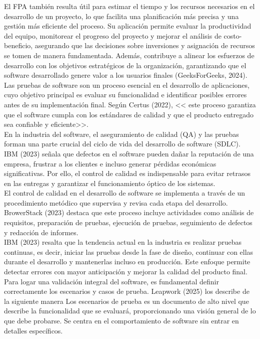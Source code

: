 \documentclass[12pt,letterpaper,spanish, xcolor=table]{report}
\numberwithin{figure}{subsection}
\begin{document}
El FPA también resulta útil para estimar el tiempo y los recursos necesarios en el desarrollo de un proyecto, lo que facilita una planificación más precisa y una gestión más eficiente del proceso. Su aplicación permite evaluar la productividad del equipo, monitorear el progreso del proyecto y mejorar el análisis de costo-beneficio, asegurando que las decisiones sobre inversiones y asignación de recursos se tomen de manera fundamentada. Además, contribuye a alinear los esfuerzos de desarrollo con los objetivos estratégicos de la organización, garantizando que el software desarrollado genere valor a los usuarios finales (GeeksForGeeks, 2024).\\


Las pruebas de software son un proceso esencial en el desarrollo de aplicaciones, cuyo objetivo principal es evaluar su funcionalidad e identificar posibles errores antes de su implementación final. Según Certus (2022), << este proceso garantiza que el software cumpla con los estándares de calidad y que el producto entregado sea confiable y eficiente>>.\\

En la industria del software, el aseguramiento de calidad (QA) y las pruebas forman una parte crucial del ciclo de vida del desarrollo de software (SDLC). IBM (2023) señala que defectos en el software pueden dañar la reputación de una empresa, frustrar a los clientes e incluso generar pérdidas económicas significativas. Por ello, el control de calidad es indispensable para evitar retrasos en las entregas y garantizar el funcionamiento óptico de los sistemas.\\

El control de calidad en el desarrollo de software se implementa a través de un procedimiento metódico que supervisa y revisa cada etapa del desarrollo. BrowerStack (2023) destaca que este proceso incluye actividades como análisis de requisitos, preparación de pruebas, ejecución de pruebas, seguimiento de defectos y redacción de informes.\\

IBM (2023) resalta que la tendencia actual en la industria es realizar pruebas continuas, es decir, iniciar las pruebas desde la fase de diseño, continuar con ellas durante el desarrollo y mantenerlas incluso en producción. Este enfoque permite detectar errores con mayor anticipación y mejorar la calidad del producto final.\\

Para logar una validación integral del software, es fundamental definir correctamente los escenarios y casos de prueba. Leapwork (2025) los describe de la siguiente manera
Los escenarios de prueba es un documento de alto nivel que describe la funcionalidad que se evaluará, proporcionando una visión general de lo que debe probarse. Se centra en el comportamiento de software sin entrar en detalles específicos.\\
\end{document}
